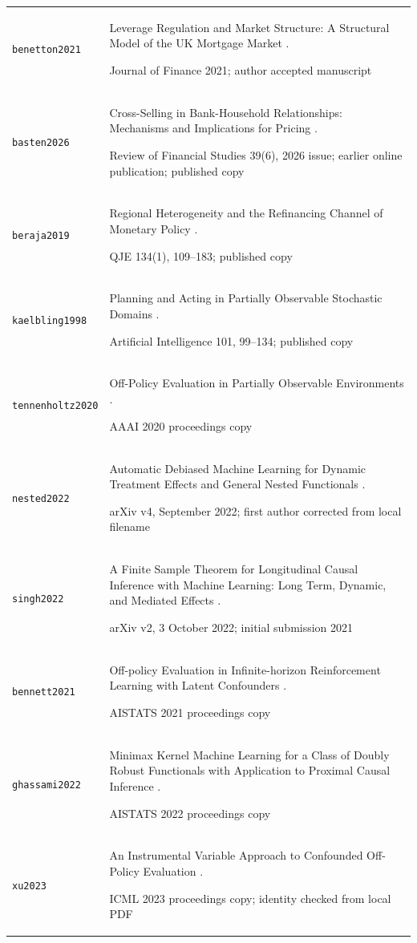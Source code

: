 \begin{longtable}{P{32mm}P{112mm}}
{\scriptsize\texttt{benetton2021}} & Leverage Regulation and Market Structure: A Structural Model of the UK Mortgage Market \citep{benetton2021}.\par Journal of Finance 2021; author accepted manuscript\\
{\scriptsize\texttt{basten2026}} & Cross-Selling in Bank-Household Relationships: Mechanisms and Implications for Pricing \citep{basten2026}.\par Review of Financial Studies 39(6), 2026 issue; earlier online publication; published copy\\
{\scriptsize\texttt{beraja2019}} & Regional Heterogeneity and the Refinancing Channel of Monetary Policy \citep{beraja2019}.\par QJE 134(1), 109–183; published copy\\
{\scriptsize\texttt{kaelbling1998}} & Planning and Acting in Partially Observable Stochastic Domains \citep{kaelbling1998}.\par Artificial Intelligence 101, 99–134; published copy\\
{\scriptsize\texttt{tennenholtz2020}} & Off-Policy Evaluation in Partially Observable Environments \citep{tennenholtz2020}.\par AAAI 2020 proceedings copy\\
{\scriptsize\texttt{nested2022}} & Automatic Debiased Machine Learning for Dynamic Treatment Effects and General Nested Functionals \citep{nested2022}.\par arXiv v4, September 2022; first author corrected from local filename\\
{\scriptsize\texttt{singh2022}} & A Finite Sample Theorem for Longitudinal Causal Inference with Machine Learning: Long Term, Dynamic, and Mediated Effects \citep{singh2022}.\par arXiv v2, 3 October 2022; initial submission 2021\\
{\scriptsize\texttt{bennett2021}} & Off-policy Evaluation in Infinite-horizon Reinforcement Learning with Latent Confounders \citep{bennett2021}.\par AISTATS 2021 proceedings copy\\
{\scriptsize\texttt{ghassami2022}} & Minimax Kernel Machine Learning for a Class of Doubly Robust Functionals with Application to Proximal Causal Inference \citep{ghassami2022}.\par AISTATS 2022 proceedings copy\\
{\scriptsize\texttt{xu2023}} & An Instrumental Variable Approach to Confounded Off-Policy Evaluation \citep{xu2023}.\par ICML 2023 proceedings copy; identity checked from local PDF\\

\end{longtable}
